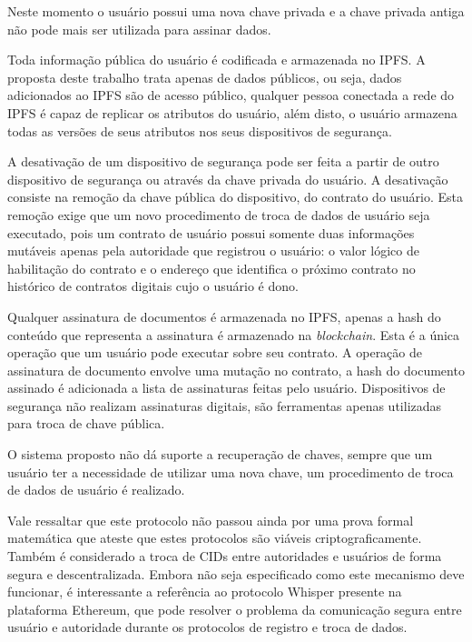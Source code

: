 \documentclass[tcc,capa]{texufpel}
\begin{document}
        Neste momento o usuário possui uma nova chave privada e a chave privada antiga não pode mais ser utilizada para assinar dados.
        
        Toda informação pública do usuário é codificada e armazenada no IPFS. A proposta deste trabalho trata apenas de dados públicos, ou seja, dados adicionados ao IPFS são de acesso público, qualquer pessoa conectada a rede do IPFS é capaz de replicar os atributos do usuário, além disto, o usuário armazena todas as versões de seus atributos nos seus dispositivos de segurança.
        
        A desativação de um dispositivo de segurança pode ser feita a partir de outro dispositivo de segurança ou através da chave privada do usuário. A desativação consiste na remoção da chave pública do dispositivo, do contrato do usuário. Esta remoção exige que um novo procedimento de troca de dados de usuário seja executado, pois um contrato de usuário possui somente duas informações mutáveis apenas pela autoridade que registrou o usuário: o valor lógico de habilitação do contrato e o endereço que identifica o próximo contrato no histórico de contratos digitais cujo o usuário é dono.
        
        Qualquer assinatura de documentos é armazenada no IPFS, apenas a hash do conteúdo que representa a assinatura é armazenado na \textit{blockchain}. Esta é a única operação que um usuário pode executar sobre seu contrato. A operação de assinatura de documento envolve uma mutação no contrato, a hash do documento assinado é adicionada a lista de assinaturas feitas pelo usuário. Dispositivos de segurança não realizam assinaturas digitais, são ferramentas apenas utilizadas para troca de chave pública.
        
        O sistema proposto não dá suporte a recuperação de chaves, sempre que um usuário ter a necessidade de utilizar uma nova chave, um procedimento de troca de dados de usuário é realizado.
        
        Vale ressaltar que este protocolo não passou ainda por uma prova formal matemática que ateste que estes protocolos são viáveis criptograficamente. Também é considerado a troca de CIDs entre autoridades e usuários de forma segura e descentralizada. Embora não seja especificado como este mecanismo deve funcionar, é interessante a referência ao protocolo Whisper presente na plataforma Ethereum, que pode resolver o problema da comunicação segura entre usuário e autoridade durante os protocolos de registro e troca de dados.
        
\end{document}
